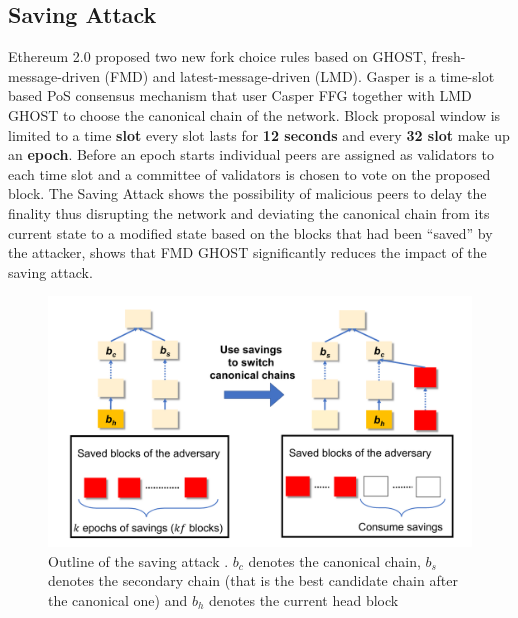 \documentclass[12pt,twocolumn]{article}
\begin{document}
\subsection{Saving Attack}
Ethereum 2.0 proposed two new fork choice rules \cite{eth2:spec} based on GHOST, fresh-message-driven (FMD) and latest-message-driven (LMD).
Gasper \cite{gasper} is a time-slot based PoS consensus mechanism that user Casper FFG \cite{casper_ffg} together with LMD GHOST to choose the
canonical chain of the network. Block proposal window is limited to a time \textbf{slot} every slot lasts for \textbf{12 seconds}
and every \textbf{32 slot} make up an \textbf{epoch}. Before an epoch starts individual peers are assigned as validators to each time slot and a committee of validators
is chosen to vote on the proposed block. The Saving Attack \cite{saving_attack} shows the possibility of malicious peers to delay the finality thus disrupting the network
and deviating the canonical chain from its current state to a modified state based on the blocks that had been ``saved'' by the attacker, \cite{saving_attack} shows that FMD GHOST
significantly reduces the impact of the saving attack.
\begin{figure}[h]
    \includegraphics[width=\linewidth]{fig/saving_attack.png}
    \caption{Outline of the saving attack \cite{saving_attack}.
    $b_c$ denotes the canonical chain, $b_s$ denotes the secondary chain (that is the best candidate chain after the canonical one) 
    and $b_h$ denotes the current head block
    }
\end{figure}
\end{document}
